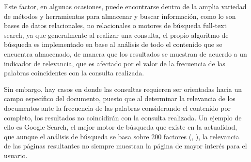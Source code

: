 Este factor, en algunas ocasiones, puede encontrarse dentro de la amplia variedad de m\'etodos y herramientas para almacenar y buscar informaci\'on, como lo son bases de datos relacionales, no relacionales o motores de b\'usqueda full-text search, ya que generalmente al realizar una consulta, el propio algoritmo de búsqueda es implementado en base al análisis de todo el contenido que se encuentra almacenado, de manera que los resultados se muestran de acuerdo a un indicador de relevancia, que es afectado por el valor de la frecuencia de las palabras coincidentes con la consulta realizada.

%
%
%

Sin embargo, hay casos en donde las consultas requieren ser orientadas hacia un campo espec\'ifico del documento, puesto que al determinar la relevancia de los documentos ante la frecuencia de las palabras considerando el contenido por completo, los resultados no coincidir\'an con la consulta realizada. Un ejemplo de ello es Google Search, el mejor motor de búsqueda que existe en la actualidad, que aunque el análisis de búsqueda se basa sobre 200 factores (\citeauthor{link_200google}, \citeyear{link_200google}), la relevancia de las páginas resultantes no siempre muestran la página de mayor interés para el usuario.



%
%
%
%
%
%
%
%
%

